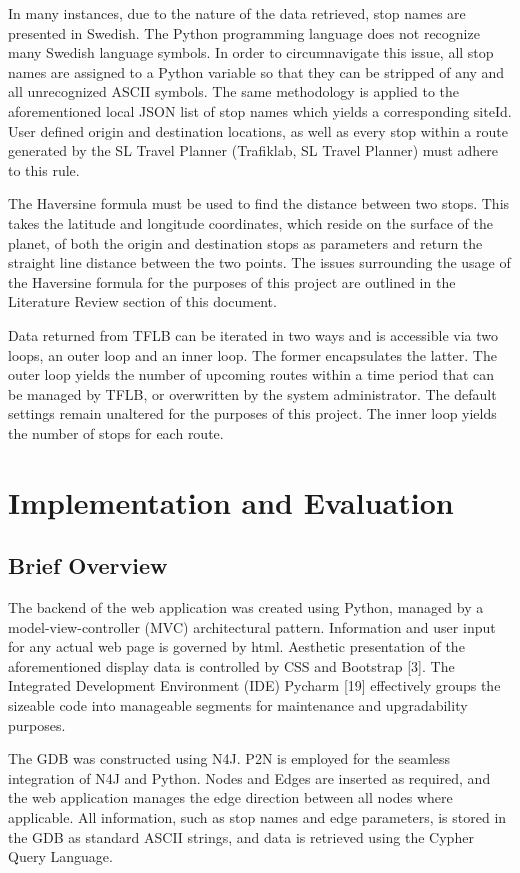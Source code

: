 \documentclass[12pt]{article}   	%
\begin{document}
In many instances, due to the nature of the data retrieved, stop names are presented in Swedish. The Python programming language does not recognize many Swedish language symbols. In order to circumnavigate this issue, all stop names are assigned to a Python variable so that they can be stripped of any and all unrecognized ASCII symbols. The same methodology is applied to the aforementioned local JSON list of stop names which yields a corresponding siteId. User defined origin and destination locations, as well as every stop within a route generated by the SL Travel Planner (Trafiklab, SL Travel Planner) must adhere to this rule.

The Haversine formula must be used to find the distance between two stops. This takes the latitude and longitude coordinates, which reside on the surface of the planet, of both the origin and destination stops as parameters and return the straight line distance between the two points. The issues surrounding the usage of the Haversine formula for the purposes of this project are outlined in the Literature Review section of this document.

Data returned from TFLB can be iterated in two ways and is accessible via two loops, an outer loop and an inner loop. The former encapsulates the latter. The outer loop yields the number of upcoming routes within a time period that can be managed by TFLB, or overwritten by the system administrator. The default settings remain unaltered for the purposes of this project. The inner loop yields the number of stops for each route.

\newpage

\section{Implementation and Evaluation}
\subsection{Brief Overview}
The backend of the web application was created using Python, managed by a model-view-controller (MVC) architectural pattern. Information and user input for any actual web page is governed by html. Aesthetic presentation of the aforementioned display data is controlled by CSS and Bootstrap [3]. The Integrated Development Environment (IDE) Pycharm [19] effectively groups the sizeable code into manageable segments for maintenance and upgradability purposes.

The GDB was constructed using N4J. P2N is employed for the seamless integration of N4J and Python. Nodes and Edges are inserted as required, and the web application manages the edge direction between all nodes where applicable. All information, such as stop names and edge parameters, is stored in the GDB as standard ASCII strings, and data is retrieved using the Cypher Query Language.
\end{document}
